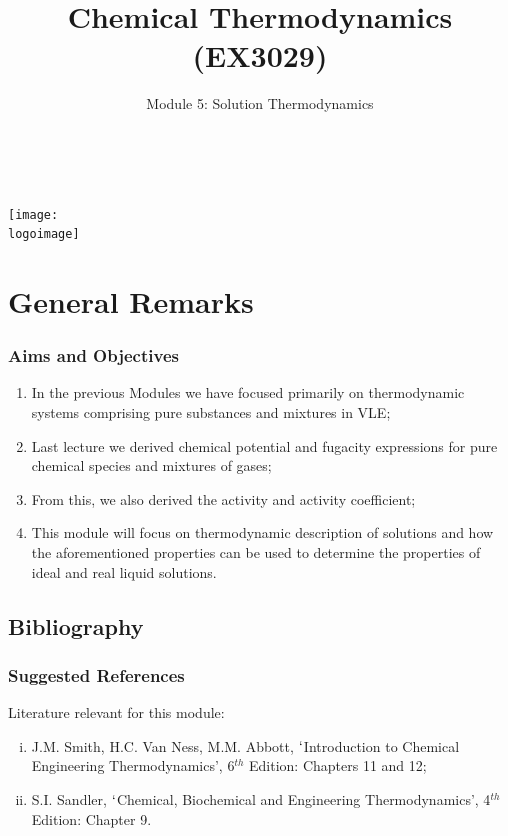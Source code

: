 \documentclass[10pt,compress,handout]{beamer}
\institute{School of Engineering}
\title{Chemical Thermodynamics (EX3029)}
\subtitle{Module 5: Solution Thermodynamics}
\date[ ]{ }
\author[\shortname]{%
  \fullname\\\ttfamily{\emailaddress}
}
\newcommand{\logoimage}{../../FigBanner/UoAHorizBanner}
\begin{document}
\begin{frame}
  \titlepage
  \vfill%
  \begin{center}
    \texttt{[image: \\logoimage]}
  \end{center}
\end{frame}




\section{General Remarks}

\begin{frame}
 \frametitle{Aims and Objectives}
   \begin{enumerate}
     \item<1-> In the previous Modules we have focused primarily on thermodynamic systems comprising pure substances and mixtures in VLE;
     \item<1-> Last lecture we derived chemical potential and fugacity expressions for pure chemical species and mixtures of gases;
     \item<1-> From this, we also derived the activity and activity coefficient;
     \item<1-> This module will focus on thermodynamic description of solutions and how the aforementioned properties can be used to determine the properties of ideal and real liquid solutions. 
   \end{enumerate}
\end{frame}


\subsection{Bibliography}
\begin{frame}
 \frametitle{Suggested References}
  Literature relevant for this module:
  \begin{enumerate}[(i)]
   \item\label{SVN_Book} J.M. Smith, H.C. Van Ness, M.M. Abbott, $\lq$Introduction to Chemical Engineering Thermodynamics', 6$^{th}$ Edition: Chapters 11 and 12;
   \item\label{Sandle_Book} S.I. Sandler, $\lq$Chemical, Biochemical and Engineering Thermodynamics', 4$^{th}$ Edition: Chapter 9.
  \end{enumerate}
\end{frame}
\end{document}
